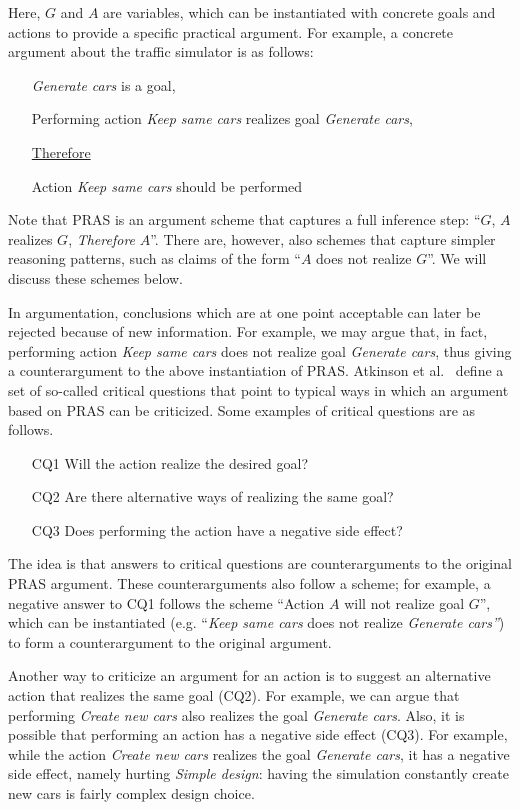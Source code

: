 Here, $G$ and $A$ are variables, which can be instantiated with concrete goals and actions to provide a specific practical argument. For example, a concrete argument about the traffic simulator is as follows: 
\begin{itemize}
\item[] \emph{Generate cars} is a goal,
\item[] Performing action \emph{Keep same cars} realizes goal \emph{Generate cars}, 
\item[] \underline{Therefore} 
\item[] Action \emph{Keep same cars} should be performed
\end{itemize}

Note that PRAS is an argument scheme that captures a full inference step: ``$G$, $A$ realizes $G$, \emph{Therefore} $A$''. There are, however, also schemes that capture simpler reasoning patterns, such as claims of the form ``$A$ does not realize $G$''. We will discuss these schemes below. 

In argumentation, conclusions which are at one point acceptable can later be rejected because of new information. For example, we may argue that, in fact, performing action \emph{Keep same cars} does not realize goal \emph{Generate cars}, thus giving a counterargument to the above instantiation of PRAS. Atkinson et al.~\cite{atkinson2007} define a set of so-called critical questions that point to typical ways in which an argument based on PRAS can be criticized. Some examples of critical questions are as follows.

\begin{enumerate}
\item[CQ1] Will the action realize the desired goal?
\item[CQ2] Are there alternative ways of realizing the same goal?
\item[CQ3] Does performing the action have a negative side effect?
\end{enumerate}

The idea is that answers to critical questions are counterarguments to the original PRAS argument. These counterarguments also follow a scheme; for example, a negative answer to CQ1 follows the scheme ``Action $A$ will not realize goal $G$'', which can be instantiated (e.g. ``\emph{Keep same cars} does not realize \emph{Generate cars''}) to form a counterargument to the original argument. 

Another way to criticize an argument for an action is to suggest an alternative action that realizes the same goal (CQ2). For example, we can argue that performing \emph{Create new cars} also realizes the goal \emph{Generate cars}. Also, it is possible that performing an action has a negative side effect (CQ3). For example, while the action \emph{Create new cars} realizes the goal \emph{Generate cars}, it has a negative side effect, namely hurting \emph{Simple design}: having the simulation constantly create new cars is fairly complex design choice. 

